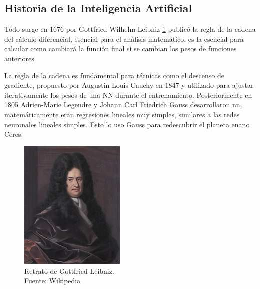 \newpage
\subsection{Historia de la Inteligencia Artificial}


Todo surge en 1676 por {Gottfried Wilhelm Leibniz} \ref{fig:gottfried-leibniz} publicó la regla de la cadena del cálculo diferencial, esencial para el análisis matemático, es la esencial para calcular como cambiará la función final si se cambian los pesos de funciones anteriores.

La regla de la cadena es fundamental para técnicas como el descenso de gradiente, propuesto por {Augustin-Louis Cauchy} en 1847 y utilizado para ajustar iterativamente los pesos de una NN durante el entrenamiento.
Posteriormente en 1805 {Adrien-Marie Legendre} y {Johann Carl Friedrich Gauss} desarrollaron \acrshort{nn}, matemáticamente eran regresiones lineales muy simples, similares a las redes neuronales lineales simples.
Esto lo uso {Gauss} para redescubrir el planeta enano Ceres.

\begin{figure}[H]
  \centering
  \includegraphics[width=0.45\textwidth]{figures/Gottfried_Wilhelm_Leibniz,_Bernhard_Christoph_Francke.jpg}
  \caption{Retrato de Gottfried Leibniz. \\Fuente: \href{https://es.wikipedia.org/wiki/Gottfried_Leibniz}{Wikipedia}}
  \label{fig:gottfried-leibniz}
\end{figure}

